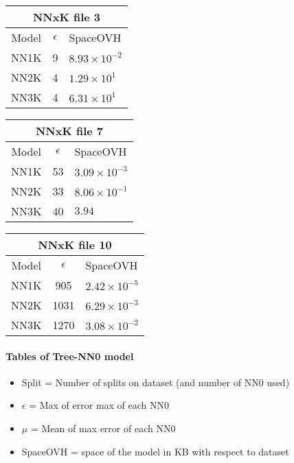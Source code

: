 \documentclass[]{article}
\begin{document}
	

		\begin{tabular}{|c | c | l|}
			
			\multicolumn{3}{c}{NNxK file 3} \\
			\hline
			Model & $\epsilon$ & SpaceOVH \\ \hline
			NN1K & 9 & $8.93 \times 10^{-2}$\\ 
			NN2K & 4 & $1.29\times 10^{1}$ \\
			NN3K & 4 &  $6.31\times 10^{1}$ \\
			\hline
		\end{tabular}
	\vspace*{0.5 cm}
		\begin{tabular}{|c | c | l|}
		
		\multicolumn{3}{c}{NNxK file 7} \\
		\hline
		Model & $\epsilon$ & SpaceOVH \\ \hline
		NN1K & 53 & $3.09 \times 10^{-3}$ \\ 
		NN2K & 33 & $8.06 \times 10^{-1}$\\
		NN3K & 40 & $3.94$\\
		\hline
		\end{tabular}
	\vspace*{0.5 cm}
		\begin{tabular}{|c | c | l|}
			
			\multicolumn{3}{c}{NNxK file 10} \\
			\hline
			Model & $\epsilon$ & SpaceOVH \\ \hline
			NN1K & 905 & $2.42 \times 10^{-5}$  \\ 
			NN2K & 1031 & $6.29 \times 10^{-3}$\\
			NN3K & 1270  & $3.08 \times 10^{-2}$ \\
			\hline
		\end{tabular}
			 

	\vspace*{0.5 cm}
	
		\paragraph{Tables of Tree-NN0 model}
	\begin{itemize}
		\item Split = Number of splits on dataset (and number of NN0 used)
		\item $\epsilon$ = Max of error max of each NN0
		\item $\mu$ = Mean of max error of each NN0
		\item SpaceOVH = space of the model in KB with respect to dataset
	\end{itemize}
	
\end{document}

